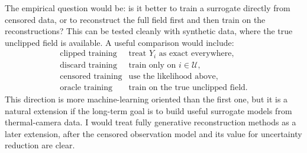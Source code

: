 The empirical question would be: is it better to train a surrogate directly from
censored data, or to reconstruct the full field first and then train on the
reconstructions?
This can be tested cleanly with synthetic data, where the true unclipped field is
available.  A useful comparison would include:
\[
\begin{array}{ll}
    \text{clipped training} & \text{treat } Y_i \text{ as exact everywhere},\\
    \text{discard training} & \text{train only on } i\in\mathcal U,\\
    \text{censored training} & \text{use the likelihood above},\\
    \text{oracle training} & \text{train on the true unclipped field.}
\end{array}
\]
This direction is more machine-learning oriented than the first one, but it is a
natural extension if the long-term goal is to build useful surrogate models from
thermal-camera data.  I would treat fully generative reconstruction methods as a
later extension, after the censored observation model and its value for
uncertainty reduction are clear.
